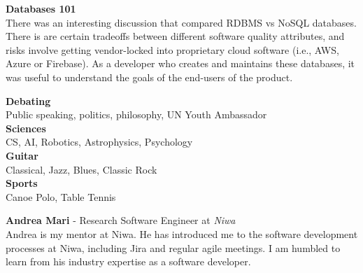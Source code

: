 \documentclass[9pt]{developercv}
\begin{document}
\textbf{Databases 101} \\
There was an interesting discussion that compared RDBMS vs NoSQL databases. There is are certain tradeoffs between different software quality attributes, and risks involve getting vendor-locked into proprietary cloud software (i.e., AWS, Azure or Firebase). As a developer who creates and maintains these databases, it was useful to understand the goals of the end-users of the product.




{
  \textbf{Debating} \\
  Public speaking, politics, philosophy, UN Youth Ambassador\\
}
{
  \textbf{Sciences} \\
  CS, AI, Robotics, Astrophysics, Psychology \\
}
{
  \textbf{Guitar} \\
  Classical, Jazz, Blues, Classic Rock \\
}
{
  \textbf{Sports} \\
  Canoe Polo, Table Tennis
}





\textbf{Andrea Mari} - Research Software Engineer at \emph{Niwa} \\
Andrea is my mentor at Niwa. He has introduced me to the software development processes at Niwa, including Jira and regular agile meetings. I am humbled to learn from his industry expertise as a software developer.\\
\end{document}
